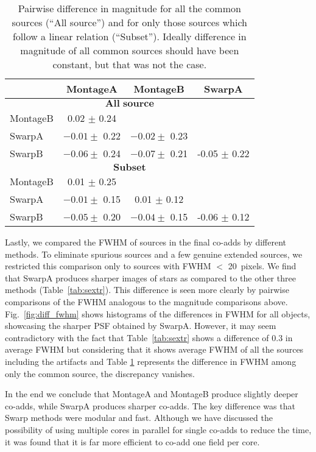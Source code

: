 \documentclass[fleqn,usenatbib]{mnras}
\begin{document}
\begin{table}
\centering
\begin{tabular}{l|c|c|c}
\hline
 & MontageA & MontageB & SwarpA \\
 \hline
\multicolumn{4}{c}{$ \textbf{All source}$}\\
\hline
MontageB & 0.02 $\pm$ 0.24   &
&  \\
SwarpA & $-0.01 \pm$ 0.22& $-0.02 \pm$ 0.23& \\
SwarpB & $-0.06 \pm$ 0.24  & $-0.07 \pm$ 0.21 &-0.05 $\pm$ 0.22  \\
\hline
\multicolumn{4}{c}{$ \textbf{Subset}$}\\
\hline
 MontageB & 0.01 $\pm$ 0.25  &&   \\
 SwarpA &$-0.01 \pm$ 0.15 & 0.01 $\pm$ 0.12 & \\
SwarpB &  $-0.05\pm$ 0.20  & $-0.04 \pm$ 0.15& -0.06 $\pm$ 0.12  \\
\hline
\end{tabular}
\caption{\label{table:pair}Pairwise difference in magnitude for all the common sources (``All source'') and for only those sources which follow a linear relation (``Subset''). Ideally difference in magnitude of all common sources should have been constant, but that was not the case. }

\end{table}



Lastly, we compared the FWHM of sources in the final co-adds by different methods. To eliminate spurious sources and a few genuine extended sources, we restricted this comparison only to sources with FWHM $<$ 20~pixels. We find that SwarpA produces sharper images of stars as compared to the other three methods (Table~\ref{tab:sextr}). This difference is seen more clearly by pairwise comparisons of the FWHM analogous to the magnitude comparisons above. Fig.~\ref{fig:diff_fwhm} shows histograms of the differences in FWHM for all objects, showcasing the sharper PSF obtained by SwarpA.  However, it may seem contradictory with the fact that Table~\ref{tab:sextr} shows a difference of 0.3 in average FWHM but considering  that it shows average FWHM of all the sources including the artifacts and Table \ref{table:pair} represents the difference in FWHM among only the common source, the discrepancy  vanishes.  

In the end we conclude that MontageA and MontageB produce slightly deeper co-adds, while SwarpA produces sharper co-adds. The key difference was that Swarp methods were modular and fast. Although we have discussed the possibility of using multiple cores in parallel for single co-adds to reduce the time, it was found that it is far more efficient to co-add one field per core.
\end{document}
